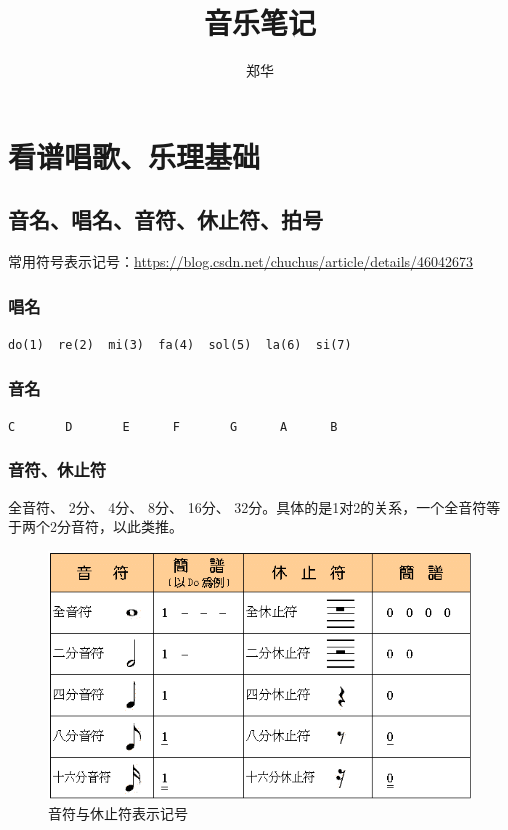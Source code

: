\documentclass[UTF8,a4paper,12pt]{ctexbook}
\author{\kaishu 郑华}
\title{\heiti 音乐笔记}
\begin{document}
 	\maketitle
 
\chapter{看谱唱歌、乐理基础}
	\section{音名、唱名、音符、休止符、拍号}
	 	常用符号表示记号：\url{https://blog.csdn.net/chuchus/article/details/46042673}
	 	
		\subsection*{唱名}
		 	
		 	\verb|do(1)  re(2)  mi(3)  fa(4)  sol(5)  la(6)  si(7)| 
		 
		\subsection*{音名}
		 	
		 	\verb|C       D       E      F       G      A      B|
	 
		\subsection*{音符、休止符}
			
			全音符、  2分、  4分、   8分、  16分、  32分。具体的是1对2的关系，一个全音符等于两个2分音符，以此类推。
		
			\begin{figure}[H]
				\centering
				\includegraphics[scale=0.7]{yinfu}
				\caption{音符与休止符表示记号}
			\end{figure}
			
\end{document}
